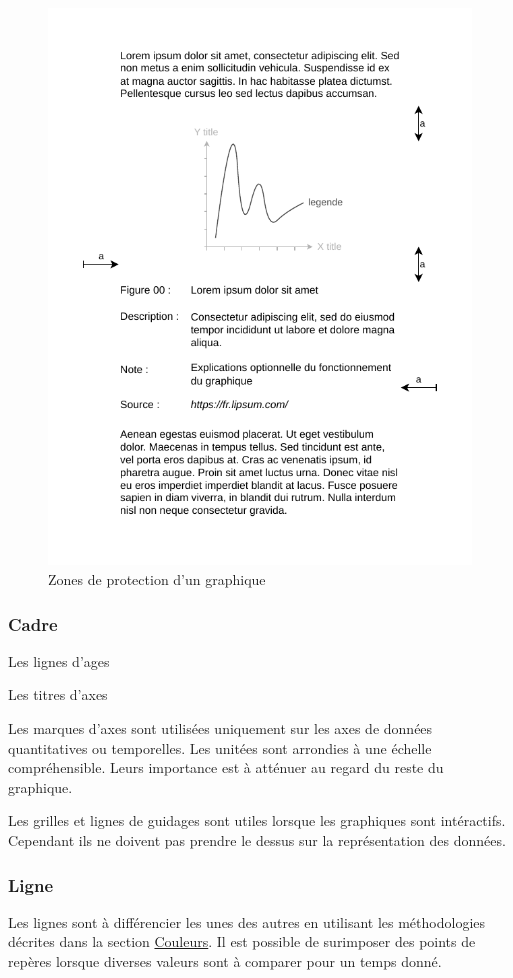 \documentclass[a4paper,12pt]{article}
\begin{document}
\begin{multicols}{2}
\begin{figure}[H]
\centering
\includegraphics[width=.9\linewidth]{./img/general-graphics-rules.pdf}
\caption{\label{fig:ZPR}Zones de protection d'un graphique}
\end{figure}
\subsubsection*{Cadre}
\label{sec:org417eb78}
Les lignes d'ages

Les titres d'axes

Les marques d'axes sont utilisées uniquement sur les axes de données quantitatives ou temporelles. Les unitées sont arrondies à une échelle compréhensible. Leurs importance est à atténuer au regard du reste du graphique. \autocite{stephenfewComponentlevelGraphDesign2012}

Les grilles et lignes de guidages sont utiles lorsque les graphiques sont intéractifs. Cependant ils ne doivent pas prendre le dessus sur la représentation des données. \autocite{dougschepersDesigningDataCognitive2022}
\subsubsection*{Ligne}
\label{sec:org000adf0}
Les lignes sont à différencier les unes des autres en utilisant les méthodologies décrites dans la section \hyperref[sec:org0c008c7]{Couleurs}. Il est possible de surimposer des points de repères lorsque diverses valeurs sont à comparer pour un temps donné. \autocite{stephenfewComponentlevelGraphDesign2012}


\end{multicols}
\end{document}
